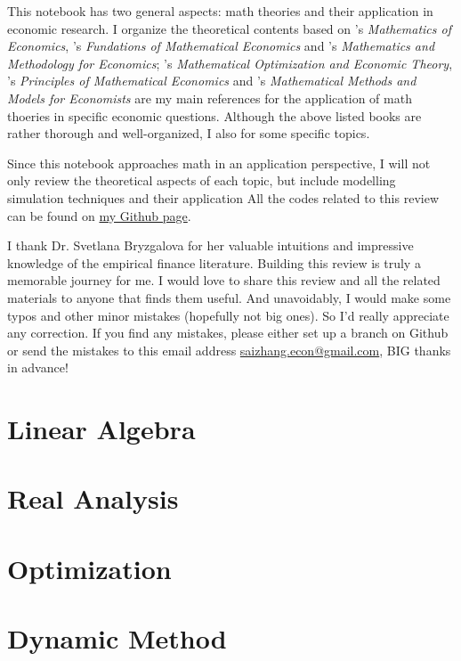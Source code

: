 \documentclass[12pt,openany]{report}
\begin{document}
This notebook has two general aspects: math theories and their application in economic research. I organize
the theoretical contents based on \citet{hoy2011mathematics}'s \textit{Mathematics of Economics}, 
\citet{carter2001foundations}'s \textit{Fundations of Mathematical Economics} and \citet{eichhornmathematics}'s 
\textit{Mathematics and Methodology for Economics}; \citet{intriligator2002mathematical}'s \textit{Mathematical Optimization and Economic Theory},
 \citet{vali2014principles}'s \textit{Principles of Mathematical Economics}
and \citet{de2000mathematical}'s \textit{Mathematical Methods and Models for Economists} are my main references
for the application of math thoeries in specific economic questions. Although the above listed books are
rather thorough and well-organized, I also  for some specific topics.


Since this notebook approaches math in an application perspective, I will not only
review the theoretical aspects of each topic, but include modelling simulation techniques
and their application  All the codes related
to this review can be found on \href{https://github.com/SaiChrisZHANG}{my Github page}.

I thank Dr. Svetlana Bryzgalova for her valuable intuitions and impressive
knowledge of the empirical finance literature. Building this review is truly
a memorable journey for me. I would love to share this review and all the related
materials to anyone that finds them useful. And unavoidably, I would make some
typos and other minor mistakes (hopefully not big ones). So I'd really appreciate
any correction. If you find any mistakes, please either set up a branch on Github
or send the mistakes to this email address 
\href{mailto:saizhang.econ@gmail.com}{saizhang.econ@gmail.com}, BIG thanks in advance!

\newpage

\dominitoc
{}
\label{ToC-first-page}
\tableofcontents

\pagestyle{mystyle}
\chapter{Linear Algebra}


\chapter{Real Analysis}

\chapter{Optimization}

\chapter{Dynamic Method}

\newpage


\end{document}
